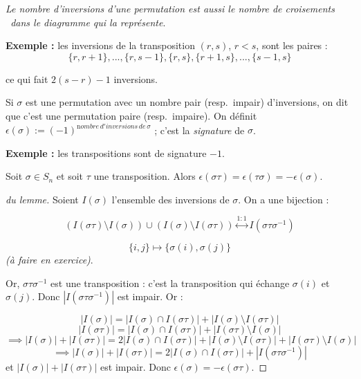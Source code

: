 \documentclass[class=report,crop=false]{standalone}
\newcommand{\exoo}{\emph{(à faire en exercice)}}
\begin{document}
{\it Le nombre d'inversions d'une permutation est aussi le nombre de \og croisements \fg\ dans le diagramme qui la représente}.



{\bf Exemple :} les inversions de la transposition $(r,s)$, $r<s$, sont les paires :
\[\{r,r+1\},...,\{r,s-1\},\{r,s\},\{r+1,s\},...,\{s-1,s\}\]

ce qui fait $2(s-r)-1$ inversions.

\begin{definition}
Si $\sigma$ est une permutation avec un nombre pair (resp.\ impair) d'inversions, on dit que c'est une permutation paire (resp.\ impaire). On définit $\epsilon(\sigma) := (-1)^{{\mathrm nombre \,d'inversions\, de\, } \sigma}$ ; c'est la {\it signature} de $\sigma$. 
\end{definition}

{\bf Exemple :} les transpositions sont de signature $-1$.

\begin{lemme}
Soit $\sigma \in S_n$ et soit $\tau$ une transposition. Alors $\epsilon(\sigma\tau) = \epsilon(\tau \sigma) = -\epsilon(\sigma)$.
\end{lemme}


\begin{proof}[du lemme]


Soient $I(\sigma)$ l'ensemble des inversions de $\sigma$. On a une bijection :

\[\left(I( \sigma\tau) \setminus I(\sigma) \right) \cup  \left(I(\sigma) \setminus I(\sigma\tau) \right)\stackrel{1:1}{\longleftrightarrow} I(\sigma \tau \sigma^{-1})\]

\[\{i,j\} \mapsto \{\sigma(i),\sigma(j)\}\]
\exoo.

Or, $\sigma\tau \sigma^{-1}$ est une transposition : c'est la transposition qui échange $\sigma(i)$ et $\sigma(j)$. Donc $|I(\sigma\tau\sigma^{-1})|$ est impair. 
Or :

\[|I(\sigma)| = |I(\sigma) \cap I(\sigma\tau)| + |I(\sigma) \setminus I(\sigma\tau)|\]
\[|I(\sigma\tau)| = |I(\sigma) \cap I(\sigma\tau)| + |I(\sigma\tau) \setminus I(\sigma)|\]
\[\implies |I(\sigma)| + |I(\sigma\tau)| = 2 |I(\sigma) \cap I(\sigma\tau)| + |I(\sigma) \setminus I(\sigma\tau)| + |I(\sigma\tau) \setminus I(\sigma)|\]
\[\implies |I(\sigma)| + |I(\sigma\tau)| = 2 |I(\sigma) \cap I(\sigma\tau)|  + |I(\sigma\tau\sigma^{-1})|\]
et $|I(\sigma)| + |I(\sigma\tau)|$ est impair. Donc $\epsilon(\sigma) = - \epsilon(\sigma\tau)$.
\end{proof}
\end{document}
